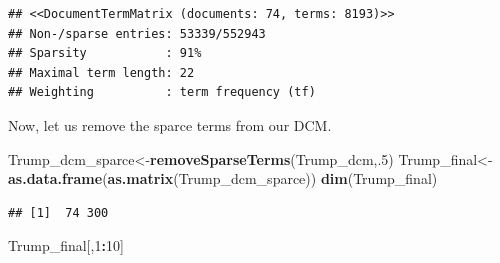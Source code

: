 \documentclass[]{article}
\newenvironment{Shaded}{\begin{snugshade}}{\end{snugshade}}
\newcommand{\KeywordTok}[1]{\textcolor[rgb]{0.13,0.29,0.53}{\textbf{#1}}}
\newcommand{\DecValTok}[1]{\textcolor[rgb]{0.00,0.00,0.81}{#1}}
\newcommand{\OperatorTok}[1]{\textcolor[rgb]{0.81,0.36,0.00}{\textbf{#1}}}
\newcommand{\NormalTok}[1]{#1}
\begin{document}
\begin{verbatim}
## <<DocumentTermMatrix (documents: 74, terms: 8193)>>
## Non-/sparse entries: 53339/552943
## Sparsity           : 91%
## Maximal term length: 22
## Weighting          : term frequency (tf)
\end{verbatim}

Now, let us remove the sparce terms from our DCM.

\begin{Shaded}
\begin{Highlighting}[]
\NormalTok{Trump_dcm_sparce<-}\KeywordTok{removeSparseTerms}\NormalTok{(Trump_dcm,.}\DecValTok{5}\NormalTok{)}
\NormalTok{Trump_final<-}\KeywordTok{as.data.frame}\NormalTok{(}\KeywordTok{as.matrix}\NormalTok{(Trump_dcm_sparce))}
\KeywordTok{dim}\NormalTok{(Trump_final)}
\end{Highlighting}
\end{Shaded}

\begin{verbatim}
## [1]  74 300
\end{verbatim}

\begin{Shaded}
\begin{Highlighting}[]
\NormalTok{Trump_final[,}\DecValTok{1}\OperatorTok{:}\DecValTok{10}\NormalTok{]}
\end{Highlighting}
\end{Shaded}
\end{document}
